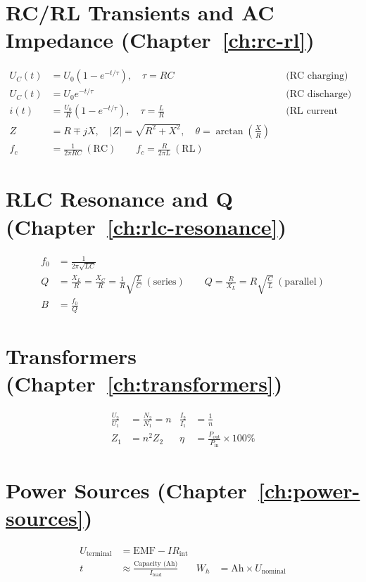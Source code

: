 \section*{RC/RL Transients and AC Impedance (Chapter~\ref{ch:rc-rl})}
\begin{align*}
U_C(t) &= U_0(1-e^{-t/\tau}), \quad \tau = RC &&\text{(RC charging)} \\
U_C(t) &= U_0 e^{-t/\tau} &&\text{(RC discharge)} \\
i(t) &= \frac{U_0}{R}(1-e^{-t/\tau}), \quad \tau = \frac{L}{R} &&\text{(RL current buildup)} \\
Z &= R\mp jX, \quad |Z| = \sqrt{R^2+X^2}, \quad \theta = \arctan\!\left(\frac{X}{R}\right) \\
f_c &= \frac{1}{2\pi RC}\ (\text{RC}) \qquad f_c = \frac{R}{2\pi L}\ (\text{RL})
\end{align*}

\section*{RLC Resonance and Q (Chapter~\ref{ch:rlc-resonance})}
\begin{align*}
f_0 &= \frac{1}{2\pi\sqrt{LC}} \\
Q &= \frac{X_L}{R} = \frac{X_C}{R} = \frac{1}{R}\sqrt{\frac{L}{C}}\ (\text{series}) \qquad
Q = \frac{R}{X_L} = R\sqrt{\frac{C}{L}}\ (\text{parallel}) \\
B &= \frac{f_0}{Q}
\end{align*}

\section*{Transformers (Chapter~\ref{ch:transformers})}
\begin{align*}
\frac{U_2}{U_1} &= \frac{N_2}{N_1} = n & \frac{I_2}{I_1} &= \frac{1}{n} \\
Z_1 &= n^2Z_2 & \eta &= \frac{P_{\text{out}}}{P_{\text{in}}}\times100\%
\end{align*}

\section*{Power Sources (Chapter~\ref{ch:power-sources})}
\begin{align*}
U_{\text{terminal}} &= \text{EMF} - IR_{\text{int}} \\
t &\approx \frac{\text{Capacity (Ah)}}{I_{\text{load}}} & W_h &= \text{Ah}\times U_{\text{nominal}}
\end{align*}

